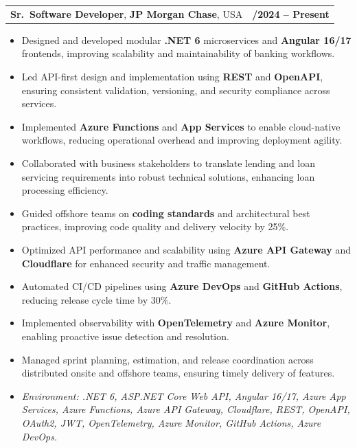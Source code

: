 \documentclass[letterpaper,11pt]{article}
\makeatletter
\newcommand{\resumeItem}[1]{
  \item\footnotesize{
    {#1 \vspace{-2pt}}
  }
}
\newcommand{\resumeSubheading}[4]{
  \vspace{-2pt}\item
    \begin{tabular*}{1.0\textwidth}[t]{l@{\extracolsep{\fill}}r}
      \textbf{\fontsize{10pt}{14pt}\selectfont #3}, \textbf{\fontsize{10pt}{14pt}\selectfont #1}, \fontsize{10pt}{14pt}\selectfont #4 & \textbf{\fontsize{10pt}{14pt}\selectfont #2} \\
    \end{tabular*}\vspace{-7pt}
}
\newcommand{\resumeItemListStart}{\begin{itemize}[leftmargin=*]}
\newcommand{\resumeItemListEnd}{\end{itemize}\vspace{-5pt}}
\makeatother
\begin{document}
\resumeSubheading
{JP Morgan Chase}{09/2024 -- Present}
{Sr.\ Software Developer}{USA}
\resumeItemListStart
  \resumeItem{Designed and developed modular \textbf{.NET 6} microservices and \textbf{Angular 16/17} frontends, improving scalability and maintainability of banking workflows.}
  \resumeItem{Led API-first design and implementation using \textbf{REST} and \textbf{OpenAPI}, ensuring consistent validation, versioning, and security compliance across services.}
  \resumeItem{Implemented \textbf{Azure Functions} and \textbf{App Services} to enable cloud-native workflows, reducing operational overhead and improving deployment agility.}
  \resumeItem{Collaborated with business stakeholders to translate lending and loan servicing requirements into robust technical solutions, enhancing loan processing efficiency.}
  \resumeItem{Guided offshore teams on \textbf{coding standards} and architectural best practices, improving code quality and delivery velocity by 25\%.}
  \resumeItem{Optimized API performance and scalability using \textbf{Azure API Gateway} and \textbf{Cloudflare} for enhanced security and traffic management.}
  \resumeItem{Automated CI/CD pipelines using \textbf{Azure DevOps} and \textbf{GitHub Actions}, reducing release cycle time by 30\%.}
  \resumeItem{Implemented observability with \textbf{OpenTelemetry} and \textbf{Azure Monitor}, enabling proactive issue detection and resolution.}
  \resumeItem{Managed sprint planning, estimation, and release coordination across distributed onsite and offshore teams, ensuring timely delivery of features.}
  \resumeItem{\textit{Environment: .NET 6, ASP.NET Core Web API, Angular 16/17, Azure App Services, Azure Functions, Azure API Gateway, Cloudflare, REST, OpenAPI, OAuth2, JWT, OpenTelemetry, Azure Monitor, GitHub Actions, Azure DevOps.}}
\resumeItemListEnd
\end{document}
